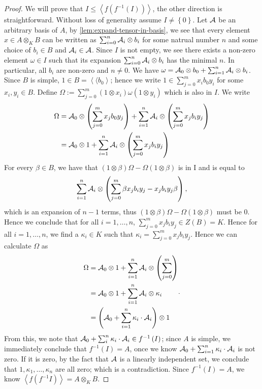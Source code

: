 \begin{proof}
  We will prove that
  $I \le \left\langle f\left(f^{-1}\left(I\right)\right)\right\rangle$, the
  other direction is straightforward. Without loss of generality assume
  $I\ne\left\{0\right\}$. Let $\mathcal{A}$ be an arbitrary basis of $A$, by
  \cref{lem:expand-tensor-in-basis}, we see that every element
  $x \in A\otimes_{K}B$ can be written as $\sum_{i=0}^{n}\mathcal{A}_{i}\otimes b_{i}$
  for some natrual number $n$ and some choice of $b_{i}\in B$ and
  $\mathcal{A}_{i}\in \mathcal{A}$. Since $I$ is not empty, we see there exists a non-zero
  element $\omega\in I$ such that its expansion
  $\sum_{i=0}^{n}\mathcal{A}_{i}\otimes b_{i}$ has the minimal $n$. In particular, all
  $b_{i}$ are non-zero and $n\ne0$. We have
  $\omega=\mathcal{A}_{0}\otimes b_{0}+\sum_{i=1}^{n}\mathcal{A}_{i}\otimes b_{i}$. Since $B$
  is simple, $1 \in B = \left\langle\langle b_{0} \right\rangle$; hence we write
  $1\in\sum_{j=0}^{m}x_{i}b_{0}y_{i}$ for some $x_{i},y_{i}\in B$. Define
  $\Omega := \sum_{j=0}^{m}(1\otimes x_{i})\omega(1\otimes y_{i})$ which is also
  in $I$. We write
  \[
    \begin{aligned}
      \Omega &= \mathcal{A}_{0} \otimes \left(\sum_{j=0}^{m}x_{j}b_{0}y_{j}\right) + \sum_{i=1}^{n}\mathcal{A}_{i}\otimes\left(\sum_{j=0}^{m}x_{j}b_{i}y_{j}\right) \\
             &= \mathcal{A}_{0}\otimes 1 + \sum_{i=1}^{n}\mathcal{A}_{i}\otimes\left(\sum_{j=0}^{m}x_{j}b_{i}y_{j}\right)
    \end{aligned}
  \]
  For every $\beta\in B$, we have that
  $\left(1\otimes \beta\right)\Omega - \Omega\left(1\otimes \beta\right)$ is in
  I and is equal to
  \[
    \sum_{i=1}^{n}\mathcal{A}_{i}\otimes\left(\sum_{j=0}^{m}\beta x_{j}b_{i}y_{j}-x_{j}b_{i}y_{j}\beta\right),
  \]
  which is an expansion of $n-1$ terms, thus
  $\left(1\otimes\beta\right)\Omega-\Omega\left(1\otimes\beta\right)$ must be
  $0$. Hence we conclude that for all $i=1,\dots,n$,
  $\sum_{j=0}^{m}x_{j}b_{i}y_{j}\in Z\left(B\right)=K$. Hence for all
  $i=1,\dots,n$, we find a $\kappa_{i}\in K$ such that
  $\kappa_{i}=\sum_{j=0}^{m}x_{j}b_{i}y_{j}$. Hence we can calculate $\Omega$ as
  \[
    \begin{aligned}
      \Omega &= \mathcal{A}_{0}\otimes 1 + \sum_{i=1}^{n}\mathcal{A}_{i}\otimes\left(\sum_{j=0}^{m}\right) \\
             &= \mathcal{A}_{0}\otimes 1 + \sum_{i=1}^{n}\mathcal{A}_{i}\otimes\kappa_{i} \\
             &= \left(\mathcal{A}_{0}+\sum_{i=1}^{n}\kappa_{i}\cdot\mathcal{A}_{i}\right) \otimes 1
    \end{aligned}.
  \]
  From this, we note that
  $\mathcal{A}_{0}+\sum_{i}^{n}\kappa_{i}\cdot\mathcal{A}_{i}\in f^{-1}\left(I\right)$; since
  $A$ is simple, we immediately conclude that $f^{-1}\left(I\right) = A$, once
  we know $\mathcal{A}_{0}+\sum_{i=1}^{n}\kappa_{i}\cdot \mathcal{A}_{i}$ is not zero. If it
  is zero, by the fact that $\mathcal{A}$ is a linearly independent set, we conclude
  that $1,\kappa_{1},\dots,\kappa_{n}$ are all zero; which is a contradiction.
  Since $f^{-1}\left(I\right) = A$, we know
  $\left\langle f\left(f^{-1}I\right)\right\rangle = A \otimes_{K} B$.
\end{proof}

